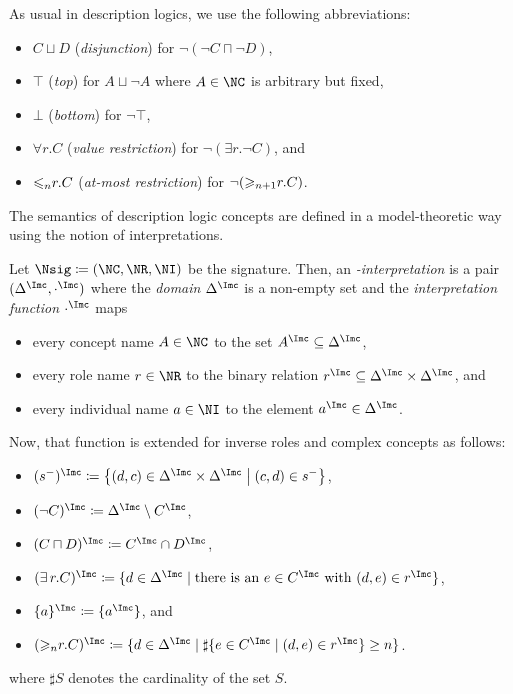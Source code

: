 As usual in description logics, we use the following abbreviations:
\begin{itemize}
\item $C\sqcup D$ (\emph{disjunction}) for $\lnot(\lnot C \sqcap \lnot D)$,
\item $\top$ (\emph{top}) for $A \sqcup \lnot A$ where $A\in\NC$ is arbitrary but fixed,
\item $\bot$ (\emph{bottom}) for $\lnot\top$,
\item $\forall r.C$ (\emph{value restriction}) for $\lnot(\exists r.\lnot C)$, and
\item ${\leqslant_{n}}r.C$ (\emph{at-most restriction}) for $\lnot({\geqslant_{n+1}}r.C)$.
\end{itemize}


The semantics of description logic concepts are defined in a model-theoretic way using the notion of
interpretations.

\begin{definition}
  \label{def:n-interpretation}
  Let $\Nsig\coloneqq(\NC,\NR,\NI)$ be the signature. Then, an \emph{\Nsig-interpretation \I} is a pair
  $(\Delta^{\I}, \cdot^{\I})$ where the \emph{domain} $\Delta^{\I}$ is a non-empty set and
  the \emph{interpretation function} $\cdot^{\I}$ maps 
  \begin{itemize}
  \item every concept name $A\in\NC$ to the set $A^{\I}\subseteq\Delta^{\I}$,
  \item every role name $r\in\NR$ to the binary relation
    $r^{\I}\subseteq\Delta^{\I}\times\Delta^{\I}$, and
  \item every individual name $a\in\NI$ to the element $a^{\I}\in\Delta^{\I}$.
  \end{itemize}

  Now, that function is extended for inverse roles and complex concepts as follows:
  \begin{itemize}
  \item $(s^{-})^{\I} \coloneqq \left\{(d,c)\in\Delta^{\I}\times\Delta^{\I}\mmid (c,d)\in
      s^{-}\right\}$,
  \item $(\lnot C)^{\I} \coloneqq \Delta^{\I} \setminus C^{\I}$,
  \item $(C \sqcap D)^{\I} \coloneqq C^{\I} \cap D^{\I}$,
  \item $(\exists r.C)^{\I} \coloneqq \{d \in \Delta^\I \mid \text{there is an}\ e \in C^\I \
    \text{with}\ (d,e)\in r^\I\}$,
  \item $\{a\}^{\I} \coloneqq \{a^{\I}\}$, and
  \item $(\atleast{n}{r}{C})^{\I} \coloneqq \{d \in \Delta^{\I} \mid \sharp\{e\in C^{\I}\mid (d,e)\in r^{\I}\}\ge n\}$.
  \end{itemize}
  where $\sharp S$ denotes the cardinality of the set $S$.
\end{definition}

